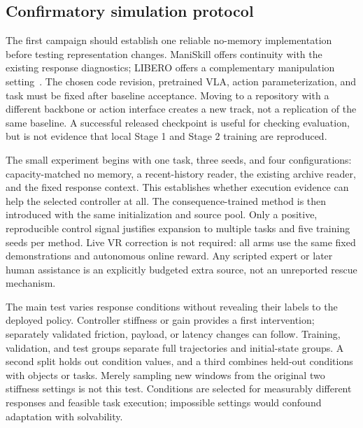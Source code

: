 \documentclass[10pt,letterpaper]{article}
\begin{document}
\subsection{Confirmatory simulation protocol}
\label{sec:confirm}
The first campaign should establish one reliable no-memory implementation before testing representation changes. ManiSkill offers continuity with the existing response diagnostics; LIBERO offers a complementary manipulation setting~\citep{libero}. The chosen code revision, pretrained VLA, action parameterization, and task must be fixed after baseline acceptance. Moving to a repository with a different backbone or action interface creates a new track, not a replication of the same baseline. A successful released checkpoint is useful for checking evaluation, but is not evidence that local Stage 1 and Stage 2 training are reproduced.

The small experiment begins with one task, three seeds, and four configurations: capacity-matched no memory, a recent-history reader, the existing archive reader, and the fixed response context. This establishes whether execution evidence can help the selected controller at all. The consequence-trained method is then introduced with the same initialization and source pool. Only a positive, reproducible control signal justifies expansion to multiple tasks and five training seeds per method. Live VR correction is not required: all arms use the same fixed demonstrations and autonomous online reward. Any scripted expert or later human assistance is an explicitly budgeted extra source, not an unreported rescue mechanism.

The main test varies response conditions without revealing their labels to the deployed policy. Controller stiffness or gain provides a first intervention; separately validated friction, payload, or latency changes can follow. Training, validation, and test groups separate full trajectories and initial-state groups. A second split holds out condition values, and a third combines held-out conditions with objects or tasks. Merely sampling new windows from the original two stiffness settings is not this test. Conditions are selected for measurably different responses and feasible task execution; impossible settings would confound adaptation with solvability.
\end{document}
